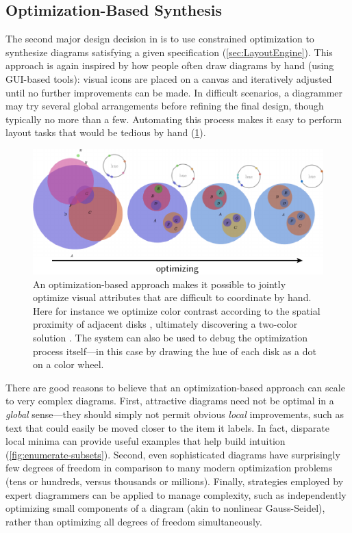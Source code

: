 \subsection{Optimization-Based Synthesis}
\label{sec:OptimizationBasedSynthesis}

The second major design decision in \Penrose{} is to use constrained optimization to synthesize diagrams satisfying a given specification (\cref{sec:LayoutEngine}).  This approach is again inspired by how people often draw diagrams by hand (\eg using GUI-based tools): visual icons are placed on a canvas and iteratively adjusted until no further improvements can be made.  In difficult scenarios, a diagrammer may try several global arrangements before refining the final design, though typically no more than a few.  Automating this process makes it easy to perform layout tasks that would be tedious by hand (\cref{fig:sets-color-opt}).

\begin{figure}[h]
  \centering
  \includegraphics[scale=1.5]{assets/penrose/sets-color-opt.pdf}
  \caption{An optimization-based approach makes it possible to jointly optimize visual attributes that are difficult to coordinate by hand.  Here for instance we optimize color contrast according to the spatial proximity of adjacent disks , ultimately discovering a two-color solution .  The system can also be used to debug the optimization process itself---in this case by drawing the hue of each disk as a dot on a color wheel.\label{fig:sets-color-opt}}
\end{figure}

There are good reasons to believe that an optimization-based approach can scale to very complex diagrams.  First, attractive diagrams need not be optimal in a \emph{global} sense---they should simply not permit obvious \emph{local} improvements, such as text that could easily be moved closer to the item it labels. In fact, disparate local minima can provide useful examples that help build intuition (\cref{fig:enumerate-subsets}).  Second, even sophisticated diagrams have surprisingly few degrees of freedom in comparison to many modern optimization problems (\eg tens or hundreds, versus thousands or millions).  Finally, strategies employed by expert diagrammers can be applied to manage complexity, such as independently optimizing small components of a diagram (akin to nonlinear Gauss-Seidel), rather than optimizing all degrees of freedom simultaneously.

